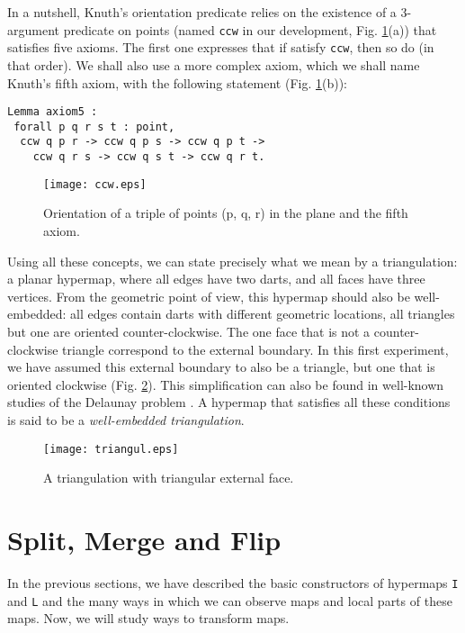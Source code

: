 \documentclass{llncs}
\begin{document}
In a nutshell, Knuth's orientation predicate relies on the existence 
of a 3-argument predicate on points (named {\tt ccw} in our development, Fig. \ref{fig:ccw}(a)) that satisfies
five axioms.  The first one expresses that if  satisfy {\tt ccw},
then so do  (in that order).  We shall also use a more complex
axiom, which we shall name Knuth's fifth axiom, with the following statement (Fig. \ref{fig:ccw}(b)):
\begin{verbatim}
Lemma axiom5 :
 forall p q r s t : point,
  ccw q p r -> ccw q p s -> ccw q p t -> 
    ccw q r s -> ccw q s t -> ccw q r t.
\end{verbatim}
\begin{figure}
\begin{center}
\texttt{[image: ccw.eps]}
\end{center}
\caption{Orientation of a triple of points (p, q, r) in the plane
 and the fifth axiom.}
\label{fig:ccw}
\end{figure}
Using all these concepts, we can state precisely what we mean by a
triangulation: a planar hypermap, where all edges have two darts,
and all faces have three vertices.
From the geometric point of view, this hypermap should also be
well-embedded: all edges contain darts with different geometric
locations, all triangles but one are oriented counter-clockwise.  The
one face that is not a counter-clockwise triangle correspond to the
external boundary.  In this first experiment, we have assumed this
external boundary to also be a triangle, but one that is oriented
clockwise (Fig. \ref{fig:triangul}).  
This simplification can also be found in well-known studies of the
Delaunay problem \cite{gs85}.  A hypermap that satisfies all these conditions
is said to be a {\em well-embedded triangulation}.  
\begin{figure}
\begin{center}
\texttt{[image: triangul.eps]}
\end{center}
\caption{A triangulation with triangular external face.}
\label{fig:triangul}
\end{figure}


\section{Split, Merge and Flip}
\label{FL}
In the previous sections, we have described the basic constructors of
hypermaps {\tt I} and {\tt L} and the many ways in
which we can observe maps and local parts of these maps.  Now, we will
study ways to transform maps.
\end{document}
